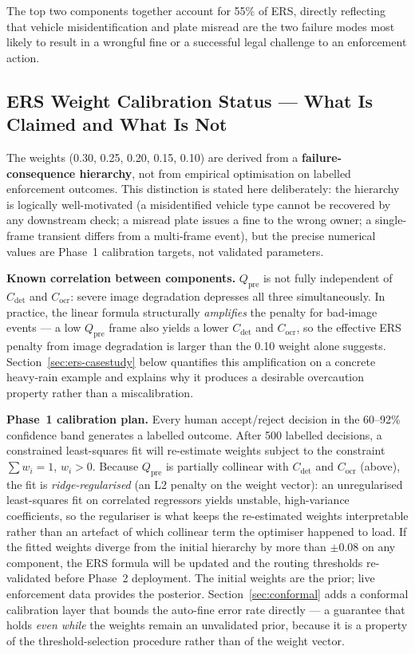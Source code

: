 \documentclass[11pt,a4paper]{article}
\begin{document}
\noindent The top two components together account for 55\% of ERS, directly reflecting that vehicle misidentification and plate misread are the two failure modes most likely to result in a wrongful fine or a successful legal challenge to an enforcement action.

\subsection*{ERS Weight Calibration Status — What Is Claimed and What Is Not}
\vspace{0.3em}
\begin{callout}
The weights (0.30, 0.25, 0.20, 0.15, 0.10) are derived from a \textbf{failure-consequence hierarchy}, not from empirical optimisation on labelled enforcement outcomes. This distinction is stated here deliberately: the hierarchy is logically well-motivated (a misidentified vehicle type cannot be recovered by any downstream check; a misread plate issues a fine to the wrong owner; a single-frame transient differs from a multi-frame event), but the precise numerical values are Phase~1 calibration targets, not validated parameters.

\textbf{Known correlation between components.} $Q_{\text{pre}}$ is not fully independent of $C_{\text{det}}$ and $C_{\text{ocr}}$: severe image degradation depresses all three simultaneously. In practice, the linear formula structurally \emph{amplifies} the penalty for bad-image events --- a low $Q_{\text{pre}}$ frame also yields a lower $C_{\text{det}}$ and $C_{\text{ocr}}$, so the effective ERS penalty from image degradation is larger than the 0.10 weight alone suggests. Section~\ref{sec:ers-casestudy} below quantifies this amplification on a concrete heavy-rain example and explains why it produces a desirable overcaution property rather than a miscalibration.

\textbf{Phase~1 calibration plan.} Every human accept/reject decision in the 60--92\% confidence band generates a labelled outcome. After 500 labelled decisions, a constrained least-squares fit will re-estimate weights subject to the constraint $\sum w_i = 1$, $w_i > 0$. Because $Q_{\text{pre}}$ is partially collinear with $C_{\text{det}}$ and $C_{\text{ocr}}$ (above), the fit is \emph{ridge-regularised} (an L2 penalty on the weight vector): an unregularised least-squares fit on correlated regressors yields unstable, high-variance coefficients, so the regulariser is what keeps the re-estimated weights interpretable rather than an artefact of which collinear term the optimiser happened to load. If the fitted weights diverge from the initial hierarchy by more than $\pm 0.08$ on any component, the ERS formula will be updated and the routing thresholds re-validated before Phase~2 deployment. The initial weights are the prior; live enforcement data provides the posterior. Section~\ref{sec:conformal} adds a conformal calibration layer that bounds the auto-fine error rate directly --- a guarantee that holds \emph{even while} the weights remain an unvalidated prior, because it is a property of the threshold-selection procedure rather than of the weight vector.
\end{callout}
\end{document}
